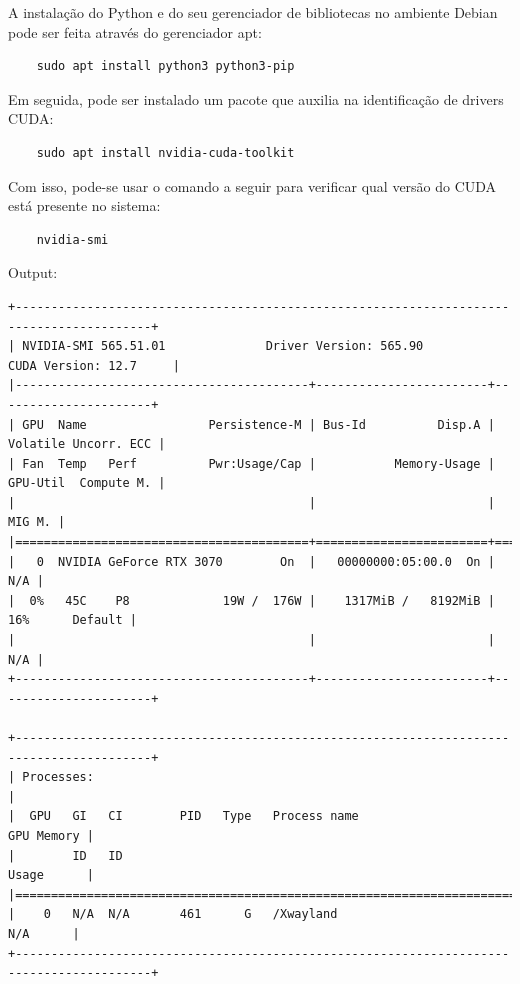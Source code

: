 \documentclass[12pt,a4paper]{article}
\begin{document}
A instalação do Python e do seu gerenciador de bibliotecas no ambiente Debian pode ser feita através do gerenciador apt:

\begin{verbatim}
    sudo apt install python3 python3-pip
\end{verbatim}

Em seguida, pode ser instalado um pacote que auxilia na identificação de drivers CUDA:

\begin{verbatim}
    sudo apt install nvidia-cuda-toolkit
\end{verbatim}

Com isso, pode-se usar o comando a seguir para verificar qual versão do CUDA está presente no sistema:

\begin{verbatim}
    nvidia-smi
\end{verbatim}

Output:

\begin{verbatim}
+-----------------------------------------------------------------------------------------+
| NVIDIA-SMI 565.51.01              Driver Version: 565.90         CUDA Version: 12.7     |
|-----------------------------------------+------------------------+----------------------+
| GPU  Name                 Persistence-M | Bus-Id          Disp.A | Volatile Uncorr. ECC |
| Fan  Temp   Perf          Pwr:Usage/Cap |           Memory-Usage | GPU-Util  Compute M. |
|                                         |                        |               MIG M. |
|=========================================+========================+======================|
|   0  NVIDIA GeForce RTX 3070        On  |   00000000:05:00.0  On |                  N/A |
|  0%   45C    P8             19W /  176W |    1317MiB /   8192MiB |     16%      Default |
|                                         |                        |                  N/A |
+-----------------------------------------+------------------------+----------------------+
                                                                                         
+-----------------------------------------------------------------------------------------+
| Processes:                                                                              |
|  GPU   GI   CI        PID   Type   Process name                              GPU Memory |
|        ID   ID                                                               Usage      |
|=========================================================================================|
|    0   N/A  N/A       461      G   /Xwayland                                   N/A      |
+-----------------------------------------------------------------------------------------+
\end{verbatim}
\end{document}
